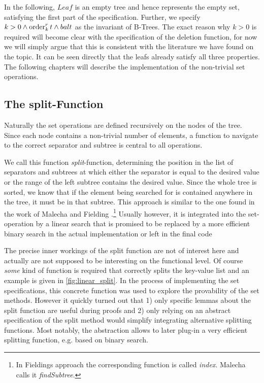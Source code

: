 In the following, $Leaf$ is an empty tree and hence represents
the empty set, satisfying the first part of the specification.
Further, we specify $k > 0 \wedge \operatorname{order}^r_k t \wedge bal t$
as the invariant of B-Trees.
The exact reason why $k > 0$ is required will become clear with the
specification of the deletion function,
for now we will simply argue that this is consistent with
the literature we have found on the topic.
It can be seen directly that the leafs already satisfy all three properties.
The following chapters will describe the implementation of the
non-trivial set operations.

\subsection{The split-Function}

Naturally the set operations are defined recursively on the nodes of the tree.
Since each node contains a non-trivial number of elements,
a function to navigate to the correct separator and subtree is central to all operations.

We call this function \textit{split}-function,
determining the position in the list of separators and subtrees at which
either the separator is equal to the desired value or the range of the left subtree
contains the desired value.
Since the whole tree is sorted, we know that if the element being searched for
is contained anywhere in the tree, it must be in that subtree.
This approach is similar to the one found in the work of Malecha and Fielding \parencite{DBLP:conf/popl/MalechaMSW10,Fielding80}.\footnote{
    In Fieldings approach the corresponding function is called \textit{index}.
    Malecha calls it \textit{findSubtree}.
}
Usually however, it is integrated into the set-operation
by a linear search that is promised to be replaced by a more efficient binary search
in the actual implementation \parencite{DBLP:books/daglib/0023376,DBLP:journals/acta/BayerM72}
or left in the final code \parencite{DBLP:journals/sosym/ErnstSR15}

The precise inner workings of the split function are not of interest here
and actually are not supposed to be interesting on the functional level.
Of course \textit{some} kind of function is required that correctly splits
the key-value list and an example is given in \autoref{fig:linear_split}.
In the process of implementing the set specifications,
this concrete function was used to explore the provability of the set methods.
However it quickly turned out that 1) only specific lemmas about the split
function are useful during proofs and 2) only relying on an abstract specification of
the split method would simplify integrating alternative splitting functions.
Most notably, the abstraction allows to later plug-in a very efficient splitting
function, e.g. based on binary search.

